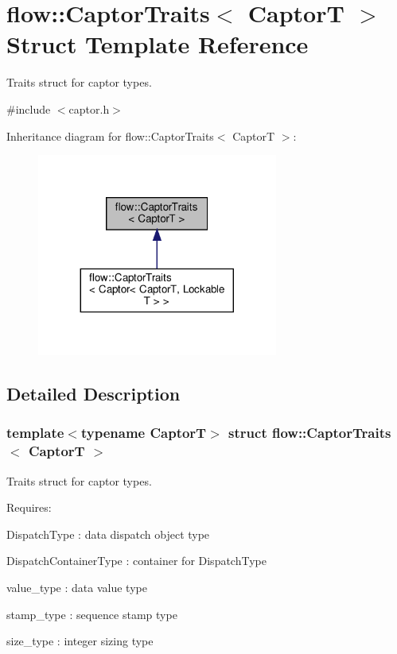 \hypertarget{structflow_1_1_captor_traits}{}\section{flow\+:\+:Captor\+Traits$<$ CaptorT $>$ Struct Template Reference}
\label{structflow_1_1_captor_traits}


Traits struct for captor types.  




{\ttfamily \#include $<$captor.\+h$>$}



Inheritance diagram for flow\+:\+:Captor\+Traits$<$ CaptorT $>$\+:\nopagebreak
\begin{figure}[H]
\begin{center}
\leavevmode
\includegraphics[width=224pt]{structflow_1_1_captor_traits__inherit__graph}
\end{center}
\end{figure}


\subsection{Detailed Description}
\subsubsection*{template$<$typename CaptorT$>$\newline
struct flow\+::\+Captor\+Traits$<$ Captor\+T $>$}

Traits struct for captor types. 

Requires\+:
\begin{DoxyItemize}
\item {\ttfamily Dispatch\+Type} \+: data dispatch object type
\item {\ttfamily Dispatch\+Container\+Type} \+: container for {\ttfamily Dispatch\+Type}
\item {\ttfamily value\+\_\+type} \+: data value type
\item {\ttfamily stamp\+\_\+type} \+: sequence stamp type
\item {\ttfamily size\+\_\+type} \+: integer sizing type
\end{DoxyItemize}


